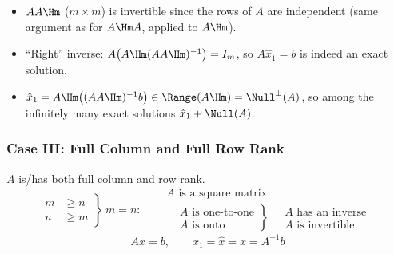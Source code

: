 \begin{insight}
\begin{itemize}[nosep,leftmargin=1.2em]
\item $AA\Hm$ ($m\times m$) is invertible since the rows of $A$ are independent (same argument as for $A\Hm A$, applied to $A\Hm$).
\item ``Right'' inverse: $A\big(A\Hm(AA\Hm)^{-1}\big)=I_m$, so $A\hat x_1=b$ is indeed an exact solution.
\item $\hat x_1=A\Hm\big((AA\Hm)^{-1}b\big)\in\Range(A\Hm)=\Null^\perp(A)$, so  among the infinitely many exact solutions $\hat x_1+\Null(A)$.
\end{itemize}
\end{insight}

\subsubsection{Case III: Full Column and Full Row Rank}
$A$ is/has both full column and row rank.
\[
\left.\begin{aligned}m&\geq n\\ n&\geq m\end{aligned}\right\}\ m=n:\quad
\begin{aligned}
&A\text{ is a square matrix}\\
&\left.\begin{aligned}&A\text{ is one-to-one}\\&A\text{ is onto}\end{aligned}\right\}
\ \begin{aligned}&A\text{ has an inverse}\\&A\text{ is invertible.}\end{aligned}
\end{aligned}
\]
\[
Ax=b,\qquad x_1=\hat{x}=x=A^{-1}b
\]

